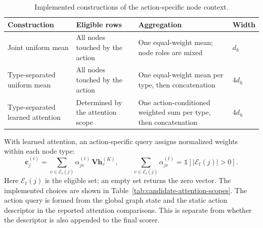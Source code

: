 \begin{table}[H]
  \centering
  \small
  \caption{Implemented constructions of the action-specific node context.}
  \label{tab:candidate-pool-modes}
  \setlength{\tabcolsep}{4pt}
  \begin{tabular}{L{0.22\textwidth}L{0.28\textwidth}L{0.30\textwidth}L{0.10\textwidth}}
    \toprule
    Construction & Eligible rows & Aggregation & Width \\
    \midrule
    Joint uniform mean
      & All nodes touched by the action
      & One equal-weight mean; node roles are mixed
      & $d_h$ \\\addlinespace[2pt]
    Type-separated uniform mean
      & All nodes touched by the action
      & One equal-weight mean per type, then concatenation
      & $4d_h$ \\\addlinespace[2pt]
    Type-separated learned attention
      & Determined by the attention scope
      & One action-conditioned weighted sum per type, then concatenation
      & $4d_h$ \\
    \bottomrule
  \end{tabular}
\end{table}

\noindent With learned attention, an action-specific query assigns normalized
weights within each node type:
\begin{equation}
  \mathbf{c}^{(t)}_j =
  \sum_{v\in\mathcal{E}_t(j)}
  \alpha^{(t)}_{jv}\,\mathbf{V}\mathbf{h}^{(K)}_v,
  \qquad
  \sum_{v\in\mathcal{E}_t(j)}\alpha^{(t)}_{jv}
  = \mathbb{1}\!\left[|\mathcal{E}_t(j)|>0\right].
  \label{eq:candidate-typed-attention}
\end{equation}
Here $\mathcal{E}_t(j)$ is the eligible set; an empty set returns the zero
vector. The implemented choices are shown in
Table~\ref{tab:candidate-attention-scopes}. The action query is formed from the
global graph state and the static action descriptor in the reported attention
comparisons. This is separate from whether the descriptor is also appended to
the final scorer.

